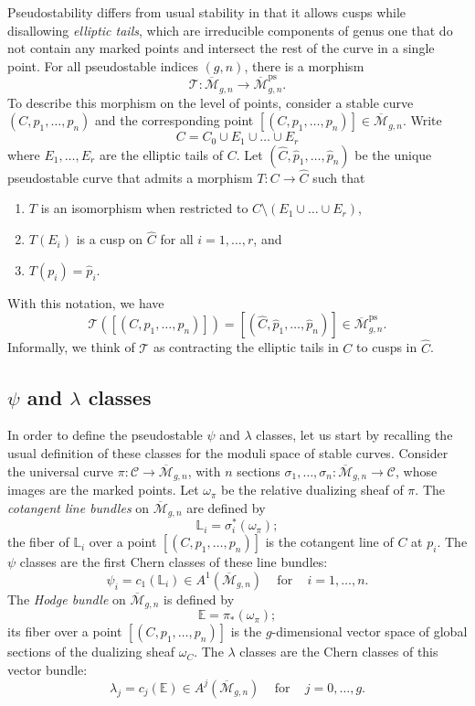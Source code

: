 \documentclass[12pt]{amsart}
\theoremstyle{definition}
\newcommand{\M}{\overline{\mathcal{M}}}
\newcommand{\ps}{\mathrm{ps}}
\newcommand{\T}{\mathcal{T}}
\newcommand{\bE}{\mathbb{E}}
\newcommand{\C}{\mathcal{C}}
\renewcommand{\L}{\mathbb{L}}
\numberwithin{equation}{section}
\begin{document}
Pseudostability differs from usual stability in that it allows cusps while disallowing \emph{elliptic tails}, which are 
irreducible components of genus one that do not contain any marked points and intersect the rest of the curve in a single point. For all pseudostable indices $(g,n)$, there is a morphism
\[
\T:\M_{g,n}\rightarrow\M_{g,n}^\ps.
\]
To describe this morphism on the level of points, consider a stable curve $(C,p_1,\dots,p_n)$ and the corresponding point $[(C,p_1,\dots,p_n)]\in\M_{g,n}$. Write
\[
C=C_0\cup E_1\cup\dots\cup E_r
\]
where $E_1,\dots,E_r$ are the elliptic tails of $C$. Let $(\widehat C,\hat p_1,\dots,\hat p_n)$ be the unique pseudostable curve that admits a morphism $T:C\rightarrow \widehat C$ such that
\begin{enumerate}
\item[(i)] $T$ is an isomorphism when restricted to $C\setminus (E_1\cup\dots\cup E_r)$,
\item[(ii)] $T(E_i)$ is a cusp on $\widehat C$ for all $i=1,\dots,r$, and
\item[(iii)] $T(p_i)=\hat p_i$.
\end{enumerate}
With this notation, we have
\[
\T([(C,p_1,\dots,p_n)])=[(\widehat C,\hat p_1,\dots, \hat p_n)]\in\M_{g,n}^\ps.
\]
Informally, we think of $\T$ as contracting the elliptic tails in $C$ to cusps in $\widehat C$. 

\subsection{$\psi$ and $\lambda$ classes}\label{sec:psilambda}

In order to define the pseudostable $\psi$ and $\lambda$ classes, let us start by recalling the usual definition of these classes for the moduli space of stable curves. Consider the universal curve $\pi:\C\rightarrow\M_{g,n}$, with $n$ sections  $\sigma_1,\dots,\sigma_n:\M_{g,n}\rightarrow \C$, whose images are the marked points. Let $\omega_\pi$ be the relative dualizing sheaf of $\pi$. The \emph{cotangent line bundles} on $\M_{g,n}$ are defined by
\[
\L_i=\sigma_i^*(\omega_\pi);
\]
the fiber of $\L_i$ over a point $[(C,p_1,\dots,p_n)]$ is the cotangent line of $C$ at $p_i$. The $\psi$ classes are the first Chern classes of these line bundles:
\[
\psi_i=c_1(\L_i)\in A^1(\M_{g,n})\;\;\;\text{ for }\;\;\;i=1,\dots,n.
\]
The \emph{Hodge bundle} on $\M_{g,n}$ is defined by
\[
\bE=\pi_*(\omega_\pi);
\]
its fiber over a point $[(C,p_1,\dots,p_n)]$ is the $g$-dimensional vector space of global sections of the dualizing sheaf $\omega_C$. The $\lambda$ classes are the Chern classes of this vector bundle:
\[
\lambda_j=c_j(\bE)\in A^j(\M_{g,n})\;\;\;\text{ for }\;\;\;j=0,\dots,g.
\]
\end{document}
